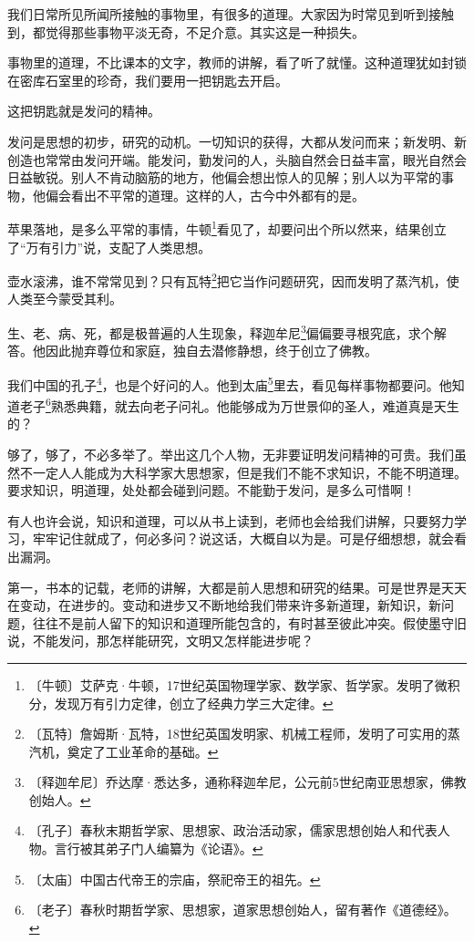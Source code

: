 \documentclass[12pt,UTF-8,openany]{ctexbook}
\begin{document}
\begin{normalsize}
    
    我们日常所见所闻所接触的事物里，有很多的道理。大家因为时常见到听到接触到，都觉得那些事物平淡无奇，不足介意。其实这是一种损失。
    
    事物里的道理，不比课本的文字，教师的讲解，看了听了就懂。这种道理犹如封锁在密库石室里的珍奇，我们要用一把钥匙去开启。
    
    这把钥匙就是发问的精神。
    
    发问是思想的初步，研究的动机。一切知识的获得，大都从发问而来；新发明、新创造也常常由发问开端。能发问，勤发问的人，头脑自然会日益丰富，眼光自然会日益敏锐。别人不肯动脑筋的地方，他偏会想出惊人的见解；别人以为平常的事物，他偏会看出不平常的道理。这样的人，古今中外都有的是。
    
    苹果落地，是多么平常的事情，牛顿\footnote{〔牛顿〕艾萨克·牛顿，17世纪英国物理学家、数学家、哲学家。发明了微积分，发现万有引力定律，创立了经典力学三大定律。}看见了，却要问出个所以然来，结果创立了“万有引力”说，支配了人类思想。
    
    壶水滚沸，谁不常常见到？只有瓦特\footnote{〔瓦特〕詹姆斯·瓦特，18世纪英国发明家、机械工程师，发明了可实用的蒸汽机，奠定了工业革命的基础。}把它当作问题研究，因而发明了蒸汽机，使人类至今蒙受其利。
    
    生、老、病、死，都是极普遍的人生现象，释迦牟尼\footnote{〔释迦牟尼〕乔达摩·悉达多，通称释迦牟尼，公元前5世纪南亚思想家，佛教创始人。}偏偏要寻根究底，求个解答。他因此抛弃尊位和家庭，独自去潜修静想，终于创立了佛教。
    
    我们中国的孔子\footnote{〔孔子〕春秋末期哲学家、思想家、政治活动家，儒家思想创始人和代表人物。言行被其弟子门人编纂为《论语》。}，也是个好问的人。他到太庙\footnote{〔太庙〕中国古代帝王的宗庙，祭祀帝王的祖先。}里去，看见每样事物都要问。他知道老子\footnote{〔老子〕春秋时期哲学家、思想家，道家思想创始人，留有著作《道德经》。}熟悉典籍，就去向老子问礼。他能够成为万世景仰的圣人，难道真是天生的？
    
    够了，够了，不必多举了。举出这几个人物，无非要证明发问精神的可贵。我们虽然不一定人人能成为大科学家大思想家，但是我们不能不求知识，不能不明道理。要求知识，明道理，处处都会碰到问题。不能勤于发问，是多么可惜啊！
    
    有人也许会说，知识和道理，可以从书上读到，老师也会给我们讲解，只要努力学习，牢牢记住就成了，何必多问？说这话，大概自以为是。可是仔细想想，就会看出漏洞。
    
    第一，书本的记载，老师的讲解，大都是前人思想和研究的结果。可是世界是天天在变动，在进步的。变动和进步又不断地给我们带来许多新道理，新知识，新问题，往往不是前人留下的知识和道理所能包含的，有时甚至彼此冲突。假使墨守旧说，不能发问，那怎样能研究，文明又怎样能进步呢？
    

\end{normalsize}
\end{document}
